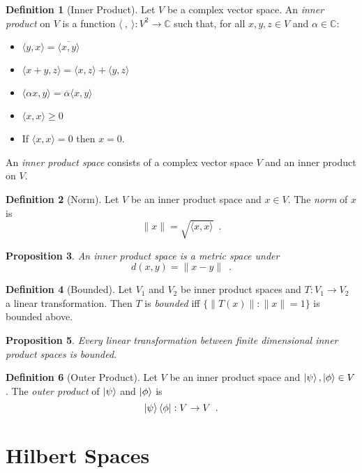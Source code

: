 \documentclass{book}
\newtheorem{prop}{Proposition}[chapter]
\theoremstyle{definition}
\newtheorem{df}[prop]{Definition}
\begin{document}
\begin{df}[Inner Product]
Let $V$ be a complex vector space. An \emph{inner product} on $V$ is a function $\langle \ , \ \rangle :  V^2 \rightarrow \mathbb{C}$ such that, for all $x,y,z \in V$ and $\alpha \in \mathbb{C}$:
\begin{itemize}
\item $\langle y,x \rangle = \overline{\langle x,y \rangle}$
\item $\langle x+y,z \rangle = \langle x,z \rangle + \langle y,z \rangle$
\item $\langle \alpha x,y \rangle = \overline{\alpha} \langle x,y \rangle$
\item $\langle x,x \rangle \geq 0$
\item If $\langle x,x \rangle = 0$ then $x = 0$.
\end{itemize}
An \emph{inner product space} consists of a complex vector space $V$ and an inner product on $V$.
\end{df}

\begin{df}[Norm]
Let $V$ be an inner product space and $x \in V$. The \emph{norm} of $x$ is
\[ \| x \| = \sqrt{\langle x,x \rangle} \enspace . \]
\end{df}

\begin{prop}
An inner product space is a metric space under
\[ d(x,y) = \| x-y \| \enspace . \]
\end{prop}


\begin{df}[Bounded]
Let $V_1$ and $V_2$ be inner product spaces and $T : V_1 \rightarrow V_2$ a linear transformation. Then $T$ is \emph{bounded} iff $\{ \| T(x) \| : \|x \| = 1 \}$ is bounded above.
\end{df}

\begin{prop}
Every linear transformation between finite dimensional inner product spaces is bounded.
\end{prop}


\begin{df}[Outer Product]
Let $V$ be an inner product space and $\left| {\psi} \right\rangle, \left| {\phi} \right\rangle \in V$. The \emph{outer product} of $\left| {\psi} \right\rangle$ and $\left| {\phi} \right\rangle$ is
\[ \left| {\psi} \right\rangle \left\langle {\phi} \right| : V \rightarrow V \enspace . \]
\end{df}

\section{Hilbert Spaces}
\end{document}
